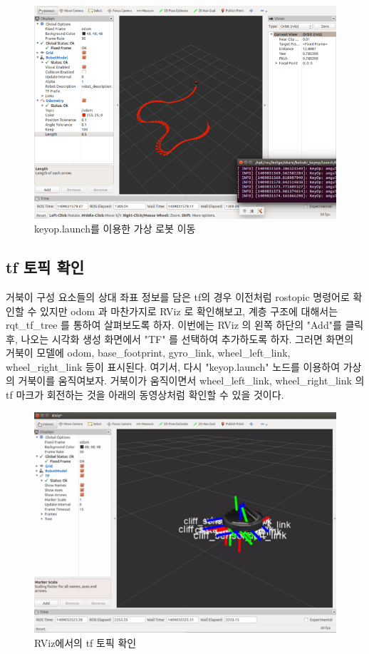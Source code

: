\begin{figure}[h]
\centering\includegraphics[width=0.9\columnwidth]{pictures/chapter10/rviz_kobuki_keyop_launch.png}
\caption{keyop.launch를 이용한 가상 로봇 이동}
\end{figure}

\subsection{tf 토픽 확인}

거북이 구성 요소들의 상대 좌표 정보를 담은 tf의 경우 이전처럼 rostopic 명령어로 확인할 수 있지만 odom 과 마찬가지로 RViz 로 확인해보고, 계층 구조에 대해서는 rqt\_tf\_tree 를 통하여 살펴보도록 하자. 이번에는 RViz 의 왼쪽 하단의 "Add"를 클릭 후, 나오는 시각화 생성 화면에서 "TF" 를 선택하여 추가하도록 하자. 그러면 화면의 거북이 모델에 odom, base\_footprint, gyro\_link, wheel\_left\_link, wheel\_right\_link 등이 표시된다. 여기서, 다시 "keyop.launch" 노드를 이용하여 가상의 거북이를 움직여보자. 거북이가 움직이면서 wheel\_left\_link, wheel\_right\_link 의 tf 마크가 회전하는 것을 아래의 동영상처럼 확인할 수 있을 것이다.

\begin{figure}[h]
\centering\includegraphics[width=0.9\columnwidth]{pictures/chapter8/rviz_kobuki_tf.png}
\caption{RViz에서의 tf 토픽 확인}
\end{figure}

